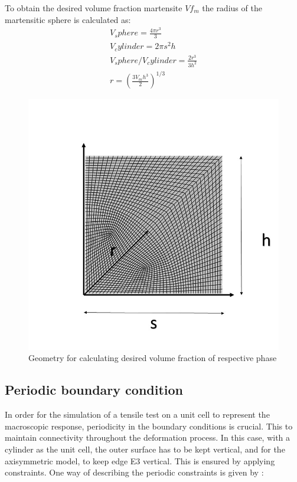 \documentclass{article}
\begin{document}
To obtain the desired volume fraction martensite $Vf_m$ the radius of the martensitic sphere is calculated as:
\begin{subequations}
    \begin{alignat}{4}
        V_sphere=\frac{4\pi r^3}{3} \\
        V_cylinder= 2\pi s^2 h\\
        V_sphere/V_cylinder = \frac{2r^3}{3h^2}\\
        r=(\frac{3 V_m h^3}{2})^{1/3}
    \end{alignat}
    \label{Eq:CalcVol}
\end{subequations}



\begin{figure}[h!]
    \centering
    \includegraphics[width=0.8\linewidth]{Axisymmodel.jpg}
    \caption{Geometry for calculating desired volume fraction of respective phase}
    \label{fig:my_label}
\end{figure}

\subsection{Periodic boundary condition}
In order for the simulation of a tensile test on a unit cell to represent the macroscopic response, periodicity in the boundary conditions is crucial. This to maintain connectivity throughout the deformation process. In this case, with a cylinder as the unit cell, the outer surface has to be kept vertical, and for the axisymmetric model, to keep edge E3 vertical. This is ensured by applying constraints. One way of describing the periodic constraints is given by \cite{Lai}:
\end{document}
